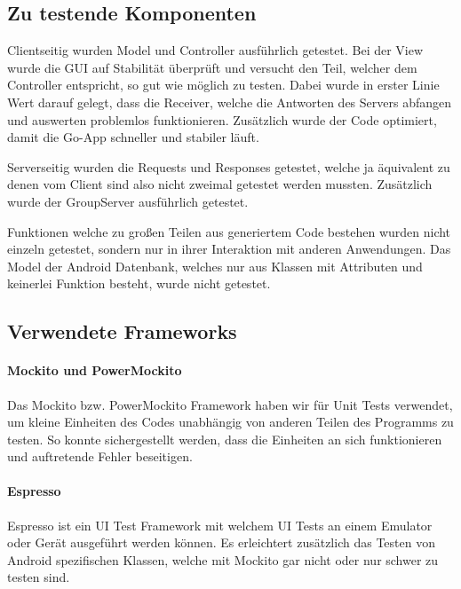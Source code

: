 \subsection{Zu testende Komponenten}

	Clientseitig wurden Model und Controller ausführlich getestet. Bei der View wurde die GUI auf Stabilität überprüft und versucht den Teil, welcher dem Controller entspricht, so gut wie möglich zu testen. Dabei wurde in erster Linie Wert darauf gelegt, dass die Receiver, welche die Antworten des Servers abfangen und auswerten problemlos funktionieren. Zusätzlich wurde der Code optimiert, damit die Go-App schneller und stabiler läuft.

	Serverseitig wurden die Requests und Responses getestet, welche ja äquivalent zu denen vom Client sind also nicht zweimal getestet werden mussten. Zusätzlich wurde der GroupServer ausführlich getestet.

	Funktionen welche zu großen Teilen aus generiertem Code bestehen wurden nicht einzeln getestet, sondern nur in ihrer Interaktion mit anderen Anwendungen.
	Das Model der Android Datenbank, welches nur aus Klassen mit Attributen und keinerlei Funktion besteht, wurde nicht getestet. 

\subsection{Verwendete Frameworks}
	\paragraph{Mockito und PowerMockito}
	Das Mockito bzw. PowerMockito Framework haben wir für Unit Tests verwendet, um kleine Einheiten des Codes unabhängig von anderen Teilen des Programms zu testen. So konnte sichergestellt werden, dass die Einheiten an sich funktionieren und auftretende Fehler beseitigen.

	\paragraph{Espresso}
	Espresso ist ein UI Test Framework mit welchem UI Tests an einem Emulator oder Gerät ausgeführt werden können. Es erleichtert zusätzlich das Testen von Android spezifischen Klassen, welche mit Mockito gar nicht oder nur schwer zu testen sind.
	
